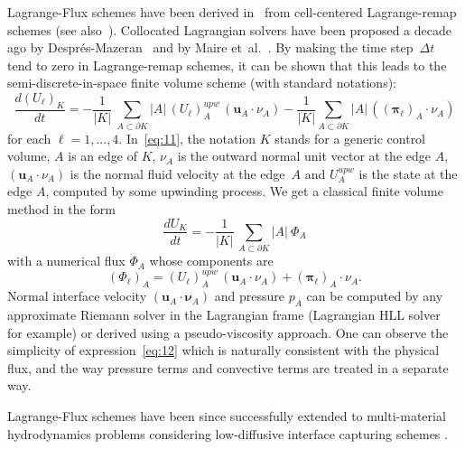 \documentclass[graybox]{svmult}
\newcommand{\bu}{\bm{u}}
\newcommand{\bnu}{\bm{\nu}}
\newcommand{\bpi}{\bm{\pi}}
\begin{document}
Lagrange-Flux schemes have been derived in~\cite{FDV16,ECCOMAS2016,PONCET2016} from cell-centered Lagrange-{re}{map} schemes (see also~\cite{GASC}). Collocated Lagrangian solvers have been proposed a decade ago by Despr\'es-Mazeran~\cite{DESPRES} and by Maire et~al.~\cite{MAIRE}. By making the time 
step~$\Delta t$ tend to zero in Lagrange-remap schemes, it can be shown that this leads to the semi-discrete-in-space finite volume scheme (with standard notations):
\begin{equation}
\frac{d (U_\ell)_K}{dt} = -\frac{1}{|K|}\
\sum_{A\subset\partial K}|A|\, (U_\ell)_A^{upw}\, (\bu_A\cdot\nu_A)
- \frac{1}{|K|}
\sum_{A\subset\partial K}  |A|\, ((\bpi_\ell)_A\cdot \nu_A) 
%
\label{eq:11}
\end{equation}
%
for each $\ell=1,...,4$. In~\eqref{eq:11}, the notation $K$ stands for a generic control volume, $A$
is an edge of $K$, $\nu_A$ is the outward normal unit vector at the edge $A$, $(\bu_A\cdot\nu_A)$ is the normal fluid velocity at the edge~$A$ and $U_A^{upw}$ is the state at the
edge $A$, computed by some upwinding process.
%
We get a classical finite volume method in the form
\[
\frac{dU_K}{dt} = - \frac{1}{|K|}\,\sum_{A\subset \partial K} |A| \ \Phi_A
\]
with a numerical flux $\Phi_A$ whose components are
%
\begin{equation}
(\Phi_\ell)_A =  (U_\ell)_A^{upw}\, (\bu_A\cdot\nu_A) + (\bpi_\ell)_A\cdot \nu_A. 
\label{eq:12}
\end{equation}
%
Normal interface velocity $(\bu_A\cdot\bnu_A)$ and pressure $p_A$ can be computed by any approximate Riemann
solver in the Lagrangian frame (Lagrangian HLL solver~\cite{FDV16} for example) or derived
using a pseudo-viscosity approach. One can observe the simplicity
of expression~\eqref{eq:12} which is naturally consistent with the physical flux, and the way
pressure terms and convective terms are treated in a separate way.

Lagrange-Flux schemes have been since successfully extended to multi-material hydrodynamics
problems considering low-diffusive interface capturing schemes \cite{FDV2016b}.
%
\vspace{-0.8cm}
\end{document}

